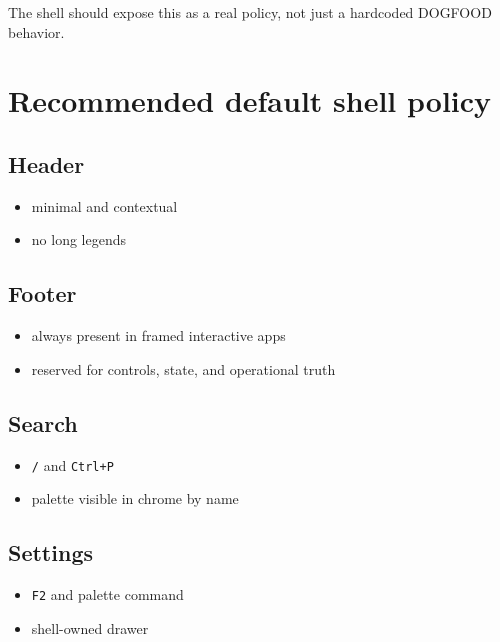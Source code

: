 The shell should expose this as a real policy, not just a hardcoded DOGFOOD behavior.

\section{Recommended default shell policy}\label{record-047-recommended-default-shell-policy}

\subsection{Header}\label{record-047-header-1}

\begin{itemize}
\tightlist
\item
  minimal and contextual
\item
  no long legends
\end{itemize}

\subsection{Footer}\label{record-047-footer-1}

\begin{itemize}
\tightlist
\item
  always present in framed interactive apps
\item
  reserved for controls, state, and operational truth
\end{itemize}

\subsection{Search}\label{record-047-search}

\begin{itemize}
\tightlist
\item
  \texttt{/} and \texttt{C\allowbreak{}t\allowbreak{}r\allowbreak{}l\allowbreak{}+\allowbreak{}P}
\item
  palette visible in chrome by name
\end{itemize}

\subsection{Settings}\label{record-047-settings}

\begin{itemize}
\tightlist
\item
  \texttt{F\allowbreak{}2} and palette command
\item
  shell-owned drawer
\end{itemize}

